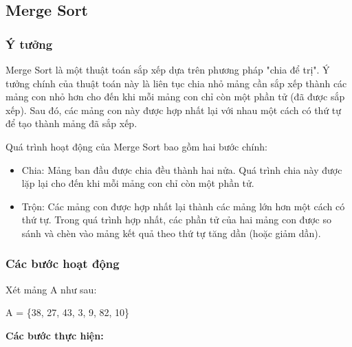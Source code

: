 \subsection{Merge Sort}

\subsubsection{Ý tưởng}
Merge Sort là một thuật toán sắp xếp dựa trên phương pháp "chia để trị". Ý tưởng chính của thuật toán này là liên tục chia nhỏ mảng cần sắp xếp thành các mảng con nhỏ hơn cho đến khi mỗi mảng con chỉ còn một phần tử (đã được sắp xếp). Sau đó, các mảng con này được hợp nhất lại với nhau một cách có thứ tự để tạo thành mảng đã sắp xếp.

Quá trình hoạt động của Merge Sort bao gồm hai bước chính:
\begin{itemize}
    \item Chia: Mảng ban đầu được chia đều thành hai nửa. Quá trình chia này được lặp lại cho đến khi mỗi mảng con chỉ còn một phần tử.
    \item Trộn: Các mảng con được hợp nhất lại thành các mảng lớn hơn một cách có thứ tự. Trong quá trình hợp nhất, các phần tử của hai mảng con được so sánh và chèn vào mảng kết quả theo thứ tự tăng dần (hoặc giảm dần).
\end{itemize}
    
\subsubsection{Các bước hoạt động}
Xét mảng A như sau: 
\begin{center}
   A = \{38, 27, 43, 3, 9, 82, 10\} 
\end{center} 

\textbf{Các bước thực hiện:}

